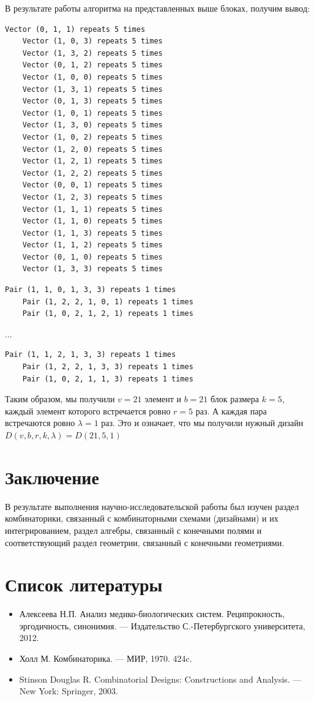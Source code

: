 \documentclass[12pt]{article}
\begin{document}
    В результате работы алгоритма на представленных выше блоках, получим вывод:
    \small
    \begin{lstlisting}
Vector (0, 1, 1) repeats 5 times
    Vector (1, 0, 3) repeats 5 times
    Vector (1, 3, 2) repeats 5 times
    Vector (0, 1, 2) repeats 5 times
    Vector (1, 0, 0) repeats 5 times
    Vector (1, 3, 1) repeats 5 times
    Vector (0, 1, 3) repeats 5 times
    Vector (1, 0, 1) repeats 5 times
    Vector (1, 3, 0) repeats 5 times
    Vector (1, 0, 2) repeats 5 times
    Vector (1, 2, 0) repeats 5 times
    Vector (1, 2, 1) repeats 5 times
    Vector (1, 2, 2) repeats 5 times
    Vector (0, 0, 1) repeats 5 times
    Vector (1, 2, 3) repeats 5 times
    Vector (1, 1, 1) repeats 5 times
    Vector (1, 1, 0) repeats 5 times
    Vector (1, 1, 3) repeats 5 times
    Vector (1, 1, 2) repeats 5 times
    Vector (0, 1, 0) repeats 5 times
    Vector (1, 3, 3) repeats 5 times
    \end{lstlisting}
    \begin{lstlisting}
Pair (1, 1, 0, 1, 3, 3) repeats 1 times
    Pair (1, 2, 2, 1, 0, 1) repeats 1 times
    Pair (1, 0, 2, 1, 2, 1) repeats 1 times
    \end{lstlisting}
    ...
    \begin{lstlisting}[firstnumber=166]
Pair (1, 1, 2, 1, 3, 3) repeats 1 times
    Pair (1, 2, 2, 1, 3, 3) repeats 1 times
    Pair (1, 0, 2, 1, 1, 3) repeats 1 times
    \end{lstlisting} \leavevmode
    \normalsize
    Таким образом, мы получили $v=21$ элемент и $b=21$ блок размера $k=5$, каждый элемент которого встречается ровно $r=5$ раз. А каждая пара встречаются ровно $\lambda=1$ раз. Это и означает, что мы получили нужный дизайн $D(v,b,r,k,\lambda) = D(21,5,1)$


    \section{Заключение}
    В результате выполнения научно-исследовательской работы был изучен раздел комбинаторики, связанный с комбинаторными схемами (дизайнами) и их интегрированием, раздел алгебры, связанный с конечными полями и соответствующий раздел геометрии, связанный с конечными геометриями.


    \section{Список литературы}
    \begin{itemize}
        \item Алексеева Н.П. Анализ медико-биологических систем. Реципрокность, эргодичность, синонимия. — Издательство С.-Петербургского университета, 2012.
        \item Холл М. Комбинаторика. — МИР, 1970. 424c.
        \item Stinson Douglas R. Combinatorial Designs: Constructions and Analysis. — New York: Springer, 2003.
    \end{itemize}
\end{document}

